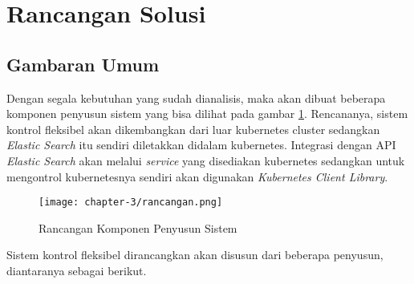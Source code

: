 \section{Rancangan Solusi}
\label{sec:rancangan-solusi}

\subsection{Gambaran Umum}
Dengan segala kebutuhan yang sudah dianalisis, maka akan dibuat beberapa komponen penyusun sistem yang bisa dilihat pada gambar \ref{fig:rancangan-sistem}. Rencananya, sistem kontrol fleksibel akan dikembangkan dari luar kubernetes cluster sedangkan \textit{Elastic Search} itu sendiri diletakkan didalam kubernetes. Integrasi dengan API \textit{Elastic Search} akan melalui \textit{service} yang disediakan kubernetes sedangkan untuk mengontrol kubernetesnya sendiri akan digunakan \textit{Kubernetes Client Library}.

\begin{figure}[h]
    \centering
    \texttt{[image: chapter-3/rancangan.png]}
    \caption{Rancangan Komponen Penyusun Sistem}
    \label{fig:rancangan-sistem}
\end{figure}

Sistem kontrol fleksibel dirancangkan akan disusun dari beberapa penyusun, diantaranya sebagai berikut.

